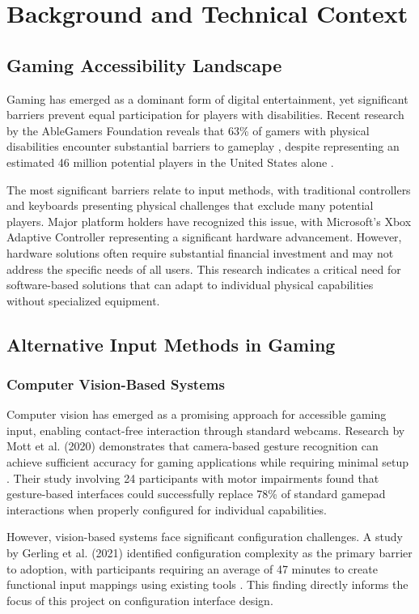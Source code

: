 \chapter{Background and Technical Context}

\section{Gaming Accessibility Landscape}
Gaming has emerged as a dominant form of digital entertainment, yet significant barriers prevent equal participation for players with disabilities. Recent research by the AbleGamers Foundation reveals that 63\% of gamers with physical disabilities encounter substantial barriers to gameplay \cite{ablegamers2023survey}, despite representing an estimated 46 million potential players in the United States alone \cite{esasurvey2022}.

The most significant barriers relate to input methods, with traditional controllers and keyboards presenting physical challenges that exclude many potential players. Major platform holders have recognized this issue, with Microsoft's Xbox Adaptive Controller representing a significant hardware advancement. However, hardware solutions often require substantial financial investment and may not address the specific needs of all users. This research indicates a critical need for software-based solutions that can adapt to individual physical capabilities without specialized equipment.

\section{Alternative Input Methods in Gaming}
\subsection{Computer Vision-Based Systems}
Computer vision has emerged as a promising approach for accessible gaming input, enabling contact-free interaction through standard webcams. Research by Mott et al. (2020) demonstrates that camera-based gesture recognition can achieve sufficient accuracy for gaming applications while requiring minimal setup \cite{mott2020}. Their study involving 24 participants with motor impairments found that gesture-based interfaces could successfully replace 78\% of standard gamepad interactions when properly configured for individual capabilities.

However, vision-based systems face significant configuration challenges. A study by Gerling et al. (2021) identified configuration complexity as the primary barrier to adoption, with participants requiring an average of 47 minutes to create functional input mappings using existing tools \cite{gerling2021}. This finding directly informs the focus of this project on configuration interface design.

